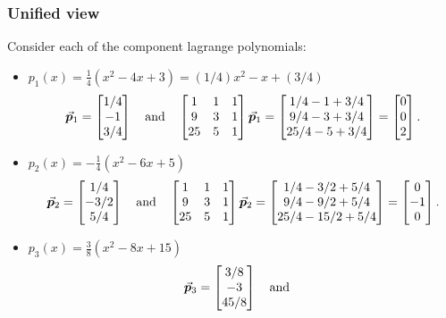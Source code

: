 \documentclass[MathsNotesBase.tex]{subfiles}
\begin{document}
{	\bigskip\bigskip
	\subsubsection{Unified view}
	\bigskip
	Consider each of the component lagrange polynomials:
	\begin{itemize}
		\item{${ p_1(x) = \frac{1}{4}(x^2-4x+3) = (1/4)x^2 - x + (3/4) }$
			\[ \vec{\bm{p}}_1 = \begin{bmatrix}1/4\\-1\\3/4\end{bmatrix} \hspace{10pt}\text{and}\hspace{10pt} 
				\begin{bmatrix}
				1 & 1 & 1\\
				9 & 3 & 1\\
				25 & 5 & 1
				\end{bmatrix}
				\vec{\bm{p}}_1 =
				\begin{bmatrix}
				1/4 - 1 + 3/4\\
				9/4 - 3 + 3/4\\
				25/4 - 5 + 3/4
				\end{bmatrix} =
				\begin{bmatrix}0\\0\\2\end{bmatrix}.
			\]
		}
		\item{${ p_2(x) = -\frac{1}{4}(x^2-6x+5) }$
			\[ \vec{\bm{p}}_2 = \begin{bmatrix}1/4\\-3/2\\5/4\end{bmatrix} \hspace{10pt}\text{and}\hspace{10pt} 
				\begin{bmatrix}
				1 & 1 & 1\\
				9 & 3 & 1\\
				25 & 5 & 1
				\end{bmatrix}
				\vec{\bm{p}}_2 =
				\begin{bmatrix}
				1/4 - 3/2 + 5/4\\
				9/4 - 9/2 + 5/4\\
				25/4 - 15/2 + 5/4
				\end{bmatrix} =
				\begin{bmatrix}0\\-1\\0\end{bmatrix}.
			\]
		}
		\item{${ p_3(x) = \frac{3}{8}(x^2-8x+15) }$
			\[ \vec{\bm{p}}_3 = \begin{bmatrix}3/8\\-3\\45/8\end{bmatrix} \hspace{10pt}\text{and}\hspace{10pt} 
\]}
\end{itemize}}
\end{document}
